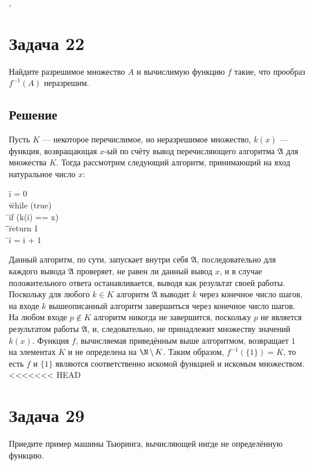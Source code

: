\documentclass[a4paper,12pt]{article}
\newcommand {\gu} [1] {\guillemotleft#1\guillemotright}
\newcommand{\tab}{\quad\=}
\newenvironment{programm}{
    \ttfamily
    \smallskip
    \begin{tabbing}
    }
    {
    \end{tabbing}
    \smallskip
}
\begin{document}
	\sep
	
	\section*{Задача 22}
	Найдите разрешимое множество $A$ и вычислимую функцию $f$ такие, что прообраз $f^{-1}(A)$ неразрешим.
	\subsection*{Решение}
	Пусть $K$ --- некоторое перечислимое, но неразрешимое множество, $k(x)$ --- функция, возвращающая $x$-ый по счёту вывод перечисляющего алгоритма $\mathfrak{A}$ для множества $K$. Тогда рассмотрим следующий алгоритм, принимающий на вход натуральное число $x$:
	\begin{programm}
	\tab i = 0\\
	\tab while (true)\\
	\tab \tab if (k(i) == x)\\
	\tab \tab \tab return 1\\
	\tab \tab i = i + 1\\
	\end{programm}
	
	Данный алгоритм, по сути, запускает внутри себя $\mathfrak{A}$, последовательно для каждого вывода $\mathfrak{A}$ проверяет, не равен ли данный вывод $x$, и в случае положительного ответа останавливается, выводя \gu{1} как результат своей работы. Поскольку для любого $k\in K$ алгоритм $\mathfrak{A}$ выводит $k$ через конечное число шагов, на входе $k$ вышеописанный алгоритм завершиться через конечное число шагов. На любом входе $p\not\in K$ алгоритм никогда не завершится, поскольку $p$ не является результатом работы $\mathfrak{A}$, и, следовательно, не принадлежит множеству значений $k(x)$. Функция $f$, вычисляемая приведённым выше алгоритмом, возвращает $1$ на элементах $K$ и не определена на $\N\,\backslash\,K$. Таким образом, $f^{-1}(\{1\})=K$, то есть $f$ и $\{1\}$ являются соответственно искомой функцией и искомым множеством.
<<<<<<< HEAD
    
	\section*{Задача 29}
    Приедите пример машины Тьюринга, вычисляющей нигде не определённую функцию.
\end{document}
